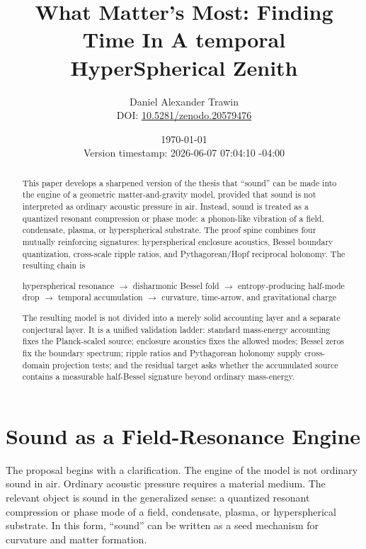\documentclass[11pt,a4paper]{article}
\title{\textbf{What Matter's Most: Finding Time In A temporal HyperSpherical Zenith}}
\author{Daniel Alexander Trawin\\
\small DOI: \href{https://doi.org/10.5281/zenodo.20579476}{10.5281/zenodo.20579476}}
\date{\today\\\small Version timestamp: 2026-06-07 07:04:10 -04:00}
\renewcommand{\fbox}[1]{#1}
\begin{document}
\maketitle

\begin{abstract}
This paper develops a sharpened version of the thesis that ``sound'' can be made into the engine of a geometric matter-and-gravity model, provided that sound is not interpreted as ordinary acoustic pressure in air. Instead, sound is treated as a quantized resonant compression or phase mode: a phonon-like vibration of a field, condensate, plasma, or hyperspherical substrate. The proof spine combines four mutually reinforcing signatures: hyperspherical enclosure acoustics, Bessel boundary quantization, cross-scale ripple ratios, and Pythagorean/Hopf reciprocal holonomy. The resulting chain is
\begin{center}
\fbox{\begin{minipage}{0.88\linewidth}
\centering
hyperspherical resonance $\rightarrow$ disharmonic Bessel fold $\rightarrow$ entropy-producing half-mode drop $\rightarrow$ temporal accumulation $\rightarrow$ curvature, time-arrow, and gravitational charge
\end{minipage}}
\end{center}
The resulting model is not divided into a merely solid accounting layer and a separate conjectural layer. It is a unified validation ladder: standard mass-energy accounting fixes the Planck-scaled source; enclosure acoustics fixes the allowed modes; Bessel zeros fix the boundary spectrum; ripple ratios and Pythagorean holonomy supply cross-domain projection tests; and the residual target asks whether the accumulated source contains a measurable half-Bessel signature beyond ordinary mass-energy.
\end{abstract}

\begingroup
\setcounter{tocdepth}{1}
\scriptsize
\renewcommand{\baselinestretch}{0.76}\selectfont
\setlength{\parskip}{0pt}
\tableofcontents
\endgroup
\newpage

\section{Sound as a Field-Resonance Engine}

The proposal begins with a clarification. The engine of the model is not ordinary sound in air. Ordinary acoustic pressure requires a material medium. The relevant object is sound in the generalized sense: a quantized resonant compression or phase mode of a field, condensate, plasma, or hyperspherical substrate. In this form, ``sound'' can be written as a seed mechanism for curvature and matter formation.
\end{document}

